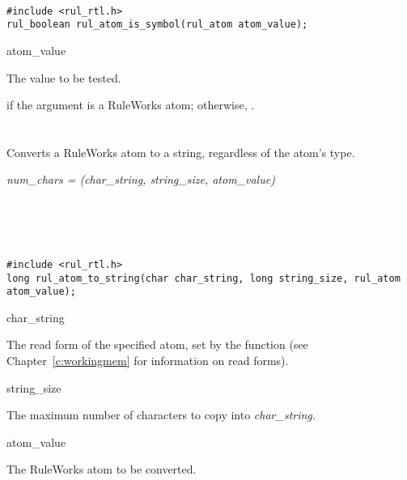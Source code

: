 \begin{args}
 \\
\end{args}

\CBinding
\begin{verbatim}
#include <rul_rtl.h>
rul_boolean rul_atom_is_symbol(rul_atom atom_value);
\end{verbatim}

\begin{argument}
\item[atom\_value]

The value to be tested.
\end{argument}

\ReturnValue

 if the argument is a RuleWorks  atom; otherwise,
.

\begin{seealso}


\end{seealso}

\section*{}

Converts a RuleWorks atom to a string, regardless of the atom's type.

\Syntax

\it{num\_chars} = (\it{char\_string},
\it{string\_size}, \it{atom\_value})

\begin{args}
   \\
   \\
   \\
\end{args}
        
\CBinding
\begin{verbatim}
#include <rul_rtl.h>
long rul_atom_to_string(char char_string, long string_size, rul_atom atom_value);
\end{verbatim}

\begin{arguments}
\item[char\_string]

  The read form of the specified atom, set by the function (see
  Chapter~\ref{c:workingmem} for information on read forms).

\item[string\_size]

  The maximum number of characters to copy into \it{char\_string}.

\item[atom\_value]

  The RuleWorks atom to be converted.
\end{arguments}

